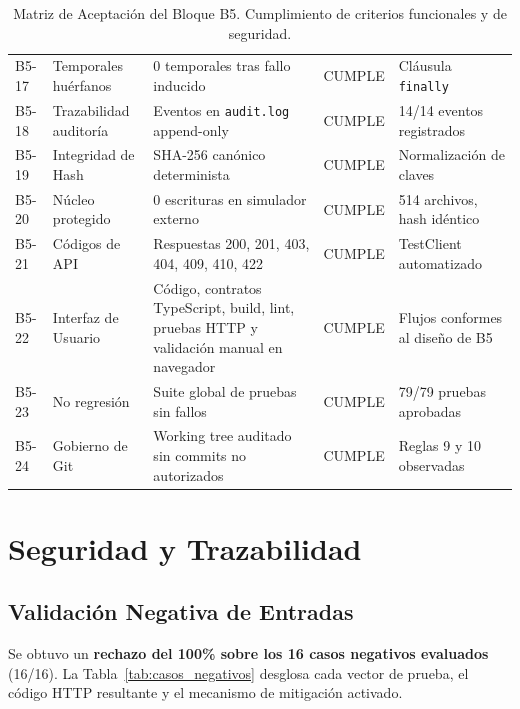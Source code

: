 \documentclass[11pt,a4paper]{article}
\begin{document}
\begin{table}[H]
\begin{tabularx}{\textwidth}{p{1.1cm}p{3.3cm}Xp{1.5cm}p{3.2cm}}
B5-17 & Temporales huérfanos & 0 temporales tras fallo inducido & CUMPLE & Cláusula \texttt{finally} \\
B5-18 & Trazabilidad auditoría & Eventos en \texttt{audit.log} append-only & CUMPLE & 14/14 eventos registrados \\
B5-19 & Integridad de Hash & SHA-256 canónico determinista & CUMPLE & Normalización de claves \\
B5-20 & Núcleo protegido & 0 escrituras en simulador externo & CUMPLE & 514 archivos, hash idéntico \\
B5-21 & Códigos de API & Respuestas 200, 201, 403, 404, 409, 410, 422 & CUMPLE & TestClient automatizado \\
B5-22 & Interfaz de Usuario & Código, contratos TypeScript, build, lint, pruebas HTTP y validación manual en navegador & CUMPLE & Flujos conformes al diseño de B5 \\
B5-23 & No regresión & Suite global de pruebas sin fallos & CUMPLE & 79/79 pruebas aprobadas \\
B5-24 & Gobierno de Git & Working tree auditado sin commits no autorizados & CUMPLE & Reglas 9 y 10 observadas \\
\bottomrule
\end{tabularx}
\caption{Matriz de Aceptación del Bloque B5. Cumplimiento de criterios funcionales y de seguridad.}
\label{tab:matriz_b5}
\end{table}

\section{Seguridad y Trazabilidad}

\subsection{Validación Negativa de Entradas}
Se obtuvo un \textbf{rechazo del 100\% sobre los 16 casos negativos evaluados} (16/16). La Tabla~\ref{tab:casos_negativos} desglosa cada vector de prueba, el código HTTP resultante y el mecanismo de mitigación activado.
\end{document}
